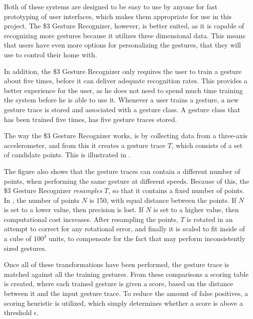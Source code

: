 Both of these systems are designed to be easy to use by anyone for fast prototyping of user interfaces, 
which makes them appropriate for use in this project.
The \$3 Gesture Recognizer, however, is better suited, 
as it is capable of recognizing more gestures because it utilizes three dimensional data.
This means that users have even more options for personalizing the gestures, 
that they will use to control their home with.

In addition, the \$3 Gesture Recognizer only requires the user to train a gesture about five times, 
before it can deliver adequate recognition rates. 
This provides a better experience for the user, 
as he does not need to spend much time training the system before he is able to use it.
Whenever a user trains a gesture, 
a new gesture trace is stored and associated with a gesture class. 
A gesture class that has been trained five times, 
has five gesture traces stored.

The way the \$3 Gesture Recognizer works, 
is by collecting data from a three-axis accelerometer, 
and from this it creates a gesture trace $T$, 
which consists of a set of candidate points. 
This is illustrated in .

The figure also shows that the gesture traces can contain a different number of points, 
when performing the same gesture at different speeds.
Because of this, the \$3 Gesture Recognizer \emph{resamples} $T$, 
so that it contains a fixed number of points. 
In \cite{threedollar}, the number of points $N$ is \num{150}, 
with equal distance between the points.
If $N$ is set to a lower value, then precision is lost. 
If $N$ is set to a higher value, then computational cost increases.
After resampling the points, 
$T$ is rotated in an attempt to correct for any rotational error, 
and finally it is scaled to fit inside of a cube of $100^3$ units, 
to compensate for the fact that may perform inconsistently sized gestures.

Once all of these transformations have been performed, 
the gesture trace is matched against all the training gestures. 
From these comparisons a scoring table is created, 
where each trained gesture is given a score, 
based on the distance between it and the input gesture trace. 
To reduce the amount of false positives, 
a scoring heuristic is utilized, 
which simply determines whether a score is above a threshold $\epsilon$.


